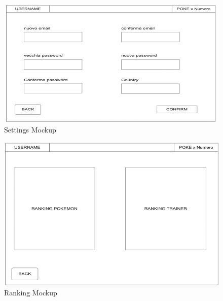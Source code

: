 \begin{figure}[h]
    \centering
    \includegraphics[width=\textwidth]{img/Picture5.png}
    \caption{Settings Mockup}
\end{figure}


\begin{figure}[h]
    \centering
    \includegraphics[width=\textwidth]{img/Picture6.png}
    \caption{Ranking Mockup}
\end{figure}